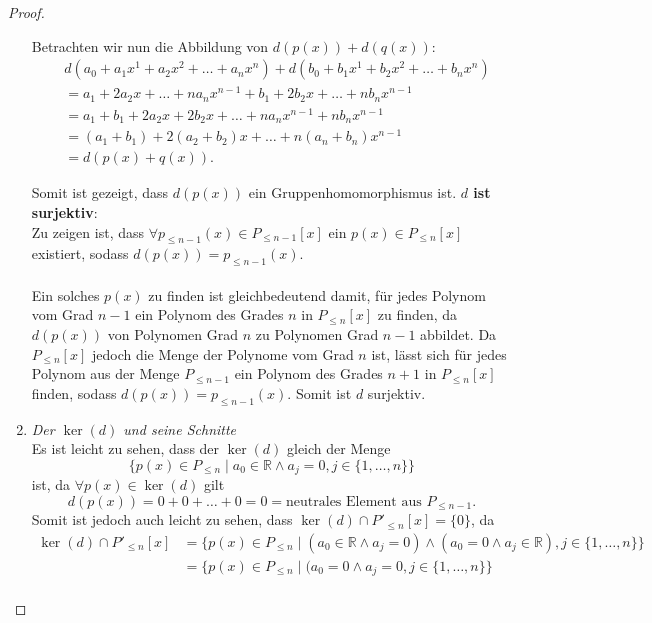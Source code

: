 \documentclass{../problemset}
\begin{document}
\begin{problem}
\begin{proof}
\begin{enumerate}
		      Betrachten wir nun die Abbildung von $d(p(x)) + d(q(x))$:
		      \begin{align}
			       & d(a_0 + a_1x^1 + a_2x^2 + \ldots + a_nx^n) + d(b_0 + b_1x^1 + b_2x^2 + \ldots + b_nx^n) \\
			       & = a_1 + 2a_2x + \ldots + na_nx^{n-1} + b_1 + 2b_2x + \ldots + nb_nx^{n-1}               \\
			       & = a_1 + b_1 + 2a_2x + 2b_2x + \ldots + na_nx^{n-1} + nb_nx^{n-1}                        \\
			       & = (a_1 + b_1) + 2(a_2 + b_2)x + \ldots + n(a_n+b_n)x^{n-1}                              \\
			       & = d(p(x) + q(x)).
		      \end{align}

		      Somit ist gezeigt, dass $d(p(x))$ ein Gruppenhomomorphismus ist.
		      \checkmark
		      \textbf{$d$ ist surjektiv}: \\
		      Zu zeigen ist, dass $\forall p_{\le n-1}(x) \in P_{\le n-1}[x]$ ein $p(x) \in P_{\le n}[x]$ existiert, sodass $d(p(x)) = p_{\le n-1}(x)$.
		      \\\\
		      Ein solches $p(x)$ zu finden ist gleichbedeutend damit, für jedes Polynom vom Grad $n-1$ ein Polynom des Grades $n$ in $P_{\le n}[x]$ zu finden,
		      da $d(p(x))$ von Polynomen Grad $n$ zu Polynomen Grad $n-1$ abbildet.
		      Da $P_{\le n}[x]$ jedoch die Menge der Polynome vom Grad $n$ ist,
		      lässt sich für jedes Polynom aus der Menge $P_{\le n - 1}$ ein Polynom des Grades $n+1$ in $P_{\le n}[x]$ finden, sodass $d(p(x)) = p_{\le n -1}(x)$.
		      Somit ist $d$ surjektiv.
		      \checkmark
		\item \textit{Der $\ker(d)$ und seine Schnitte} \\
		      Es ist leicht zu sehen, dass der $\ker(d)$ gleich der Menge
		      \[
			      \{p(x) \in P_{\le n} \mid a_0 \in \mathbb{R} \land a_j = 0, j \in \{1, \ldots, n\}\}
		      \]
		      ist, da $\forall p(x) \in \ker(d)$ gilt
		      \[
			      d(p(x)) = 0 + 0 + \ldots + 0 = 0 = \text{neutrales Element aus } P_{\le n-1}.
		      \]
		      Somit ist jedoch auch leicht zu sehen, dass $\ker(d) \cap P'_{\le n}[x] = \{0\}$, da
		      \begin{align}
			      \ker(d) \cap P'_{\le n}[x] & = \{p(x) \in P_{\le n} \mid (a_0 \in \mathbb{R} \land a_j = 0) \land (a_0 = 0 \land a_j \in \mathbb{R}), j \in \{1, \ldots, n\}\} \\
			                                 & = \{p(x) \in P_{\le n} \mid (a_0 = 0 \land a_j = 0, j \in \{1, \ldots, n\}\}                                                      \\

\end{align}
\end{enumerate}
\end{proof}
\end{problem}
\end{document}
